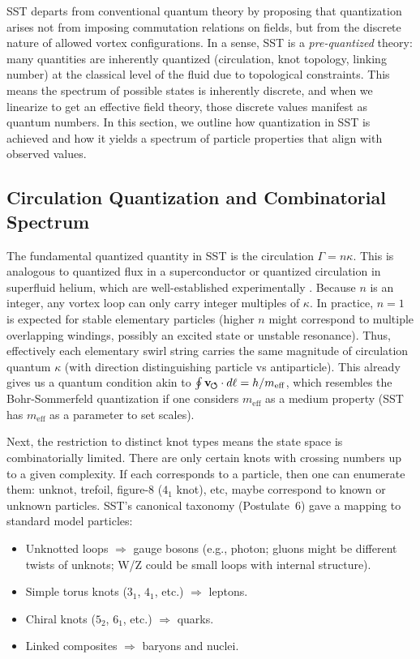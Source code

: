 \documentclass[10pt,reprint,aps,onecolumn,nofootinbib]{revtex4-2}
\newcommand{\swirlarrow}{%
    \mathchoice{\mkern-2mu\scriptstyle\boldsymbol{\circlearrowleft}}%
    {\mkern-2mu\scriptstyle\boldsymbol{\circlearrowleft}}%
    {\mkern-2mu\scriptstyle\boldsymbol{\circlearrowleft}}%
    {\mkern-2mu\scriptscriptstyle\boldsymbol{\circlearrowleft}}%
}
\newcommand{\vswirl}{\mathbf{v}_{\swirlarrow}}
\begin{document}
SST departs from conventional quantum theory by proposing that quantization arises not from imposing commutation relations on fields, but from the discrete nature of allowed vortex configurations. In a sense, SST is a \emph{pre-quantized} theory: many quantities are inherently quantized (circulation, knot topology, linking number) at the classical level of the fluid due to topological constraints. This means the spectrum of possible states is inherently discrete, and when we linearize to get an effective field theory, those discrete values manifest as quantum numbers. In this section, we outline how quantization in SST is achieved and how it yields a spectrum of particle properties that align with observed values.


\subsection{Circulation Quantization and Combinatorial Spectrum}

The fundamental quantized quantity in SST is the circulation $\Gamma = n\kappa$. This is analogous to quantized flux in a superconductor or quantized circulation in superfluid helium, which are well-established experimentally \cite{Onsager1949, Feynman1955}. Because $n$ is an integer, any vortex loop can only carry integer multiples of $\kappa$. In practice, $n=1$ is expected for stable elementary particles (higher $n$ might correspond to multiple overlapping windings, possibly an excited state or unstable resonance). Thus, effectively each elementary swirl string carries the same magnitude of circulation quantum $\kappa$ (with direction distinguishing particle vs antiparticle). This already gives us a quantum condition akin to $\oint \vswirl \cdot d\ell = h/m_{\mathrm{eff}}$, which resembles the Bohr-Sommerfeld quantization if one considers $m_{\mathrm{eff}}$ as a medium property (SST has $m_{\mathrm{eff}}$ as a parameter to set scales).


Next, the restriction to distinct knot types means the state space is combinatorially limited. There are only certain knots with crossing numbers up to a given complexity. If each corresponds to a particle, then one can enumerate them: unknot, trefoil, figure-8 ($4_1$ knot), etc, maybe correspond to known or unknown particles. SST’s canonical taxonomy (Postulate~6) gave a mapping to standard model particles:


\begin{itemize}
  \item Unknotted loops $\Rightarrow$ gauge bosons (e.g., photon; gluons might be different twists of unknots; W/Z could be small loops with internal structure).
  \item Simple torus knots ($3_1$, $4_1$, etc.) $\Rightarrow$ leptons.
  \item Chiral knots ($5_2$, $6_1$, etc.) $\Rightarrow$ quarks.
  \item Linked composites $\Rightarrow$ baryons and nuclei.
\end{itemize}
\end{document}
